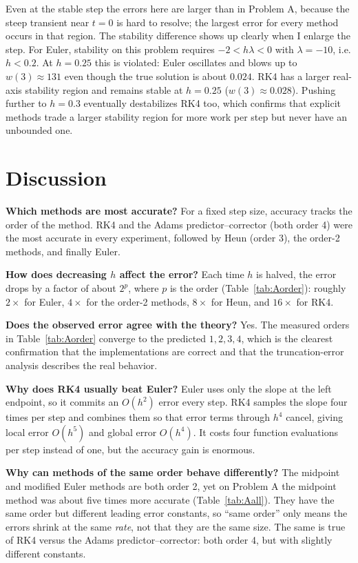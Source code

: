 \documentclass[11pt]{article}
\begin{document}
Even at the stable step the errors here are larger than in Problem A, because
the steep transient near $t = 0$ is hard to resolve; the largest error for
every method occurs in that region. The stability difference shows up clearly
when I enlarge the step. For Euler, stability on this problem requires
$-2 < h\lambda < 0$ with $\lambda = -10$, i.e. $h < 0.2$. At $h = 0.25$ this is
violated: Euler oscillates and blows up to $w(3) \approx 131$ even though the
true solution is about $0.024$. RK4 has a larger real-axis stability region and
remains stable at $h = 0.25$ ($w(3) \approx 0.028$). Pushing further to
$h = 0.3$ eventually destabilizes RK4 too, which confirms that explicit methods
trade a larger stability region for more work per step but never have an
unbounded one.

\section{Discussion}
\textbf{Which methods are most accurate?} For a fixed step size, accuracy tracks
the order of the method. RK4 and the Adams predictor--corrector (both order 4)
were the most accurate in every experiment, followed by Heun (order 3), the
order-2 methods, and finally Euler.

\textbf{How does decreasing $h$ affect the error?} Each time $h$ is halved, the
error drops by a factor of about $2^p$, where $p$ is the order
(Table~\ref{tab:Aorder}): roughly $2\times$ for Euler, $4\times$ for the
order-2 methods, $8\times$ for Heun, and $16\times$ for RK4.

\textbf{Does the observed error agree with the theory?} Yes. The measured orders
in Table~\ref{tab:Aorder} converge to the predicted $1, 2, 3, 4$, which is the
clearest confirmation that the implementations are correct and that the
truncation-error analysis describes the real behavior.

\textbf{Why does RK4 usually beat Euler?} Euler uses only the slope at the
left endpoint, so it commits an $O(h^2)$ error every step. RK4 samples the slope
four times per step and combines them so that error terms through $h^4$ cancel,
giving local error $O(h^5)$ and global error $O(h^4)$. It costs four function
evaluations per step instead of one, but the accuracy gain is enormous.

\textbf{Why can methods of the same order behave differently?} The midpoint and
modified Euler methods are both order 2, yet on Problem A the midpoint method
was about five times more accurate (Table~\ref{tab:Aall}). They have the same
order but different leading error constants, so
``same order'' only means the errors shrink at the same \emph{rate}, not that
they are the same size. The same is true of RK4 versus the Adams
predictor--corrector: both order 4, but with slightly different constants.
\end{document}
